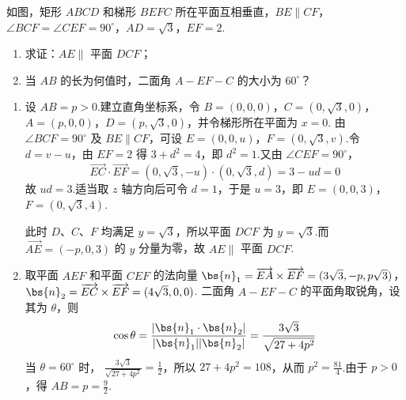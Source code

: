 \begin{problem}
如图，矩形 \(ABCD\) 和梯形 \(BEFC\) 所在平面互相垂直，\(BE \parallel CF\)，\(\angle BCF = \angle CEF = 90^\circ\)，\(AD = \sqrt{3}\)，\(EF = 2\).

\begin{enumerate}
\item 求证：\(AE \parallel\) 平面 \(DCF\)；
\item 当 \(AB\) 的长为何值时，二面角 \(A - EF - C\) 的大小为 \(60^\circ\)？
\end{enumerate}


\begin{solution}
\begin{enumerate}
\item 设 \(AB=p>0\).建立直角坐标系，令
\(B=(0,0,0)\)，\(C=(0,\sqrt3,0)\)，\(A=(p,0,0)\)，\(D=(p,\sqrt3,0)\)，并令梯形所在平面为 \(x=0\).
由 \(\angle BCF=90^\circ\) 及 \(BE\parallel CF\)，可设
\(E=(0,0,u)\)，\(F=(0,\sqrt3,v)\).令 \(d=v-u\)，由 \(EF=2\) 得
\(3+d^2=4\)，即 \(d^2=1\).又由 \(\angle CEF=90^\circ\)，
\[
\overrightarrow{EC}\cdot\overrightarrow{EF}=(0,\sqrt3,-u)\cdot(0,\sqrt3,d)=3-ud=0
\]
故 \(ud=3\).适当取 \(z\) 轴方向后可令 \(d=1\)，于是 \(u=3\)，即
\(E=(0,0,3)\)，\(F=(0,\sqrt3,4)\).

此时 \(D\)、\(C\)、\(F\) 均满足 \(y=\sqrt3\)，所以平面 \(DCF\) 为 \(y=\sqrt3\).而
\(\overrightarrow{AE}=(-p,0,3)\) 的 \(y\) 分量为零，故 \(AE\parallel\) 平面 \(DCF\).
\item 取平面 \(AEF\) 和平面 \(CEF\) 的法向量
\(\bs{n}_1=\overrightarrow{EA}\times\overrightarrow{EF}=(3\sqrt3,-p,p\sqrt3)\)，\(\bs{n}_2=\overrightarrow{EC}\times\overrightarrow{EF}=(4\sqrt3,0,0)\).
二面角 \(A-EF-C\) 的平面角取锐角，设其为 \(\theta\)，则
\[
\cos\theta=\frac{|\bs{n}_1\cdot\bs{n}_2|}{|\bs{n}_1||\bs{n}_2|}
 =\frac{3\sqrt3}{\sqrt{27+4p^2}}
\]
当 \(\theta=60^\circ\) 时，
\(\frac{3\sqrt3}{\sqrt{27+4p^2}}=\frac12\)，所以
\(27+4p^2=108\)，从而 \(p^2=\frac{81}{4}\).由于 \(p>0\)，得 \(AB=p=\frac92\).
\end{enumerate}
\end{solution}
\end{problem}

